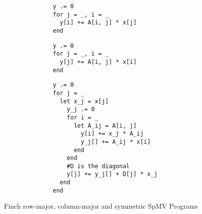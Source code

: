  \begin{wrapfigure}{r}{0.41\linewidth}
      \begin{minipage}[t]{0.18\textwidth}
          \vspace{0pt} %
          \begin{verbatim}
              y .= 0
              for j = _, i = _
                y[i] += A[i, j] * x[j]
              end
          \end{verbatim}
          \vspace{24pt} %
          \begin{verbatim}
              y .= 0
              for j = _, i = _
                y[j] += A[i, j] * x[i]
              end
          \end{verbatim}
      \end{minipage}\hfill%
      \begin{minipage}[t]{0.22\textwidth}
          \vspace{0pt} %
          \begin{verbatim}
              y .= 0
              for j = _
                let x_j = x[j]
                  y_j .= 0
                  for i = _
                    let A_ij = A[i, j]
                      y[i] += x_j * A_ij
                      y_j[] += A_ij * x[i]
                    end
                  end
                  #D is the diagonal
                  y[j] += y_j[] + D[j] * x_j
                end
              end
          \end{verbatim}
      \end{minipage}
      \vspace{-8pt}
      \caption{Finch row-major, column-major and symmetric SpMV Programs}
      \label{spmv_programs}
      \vspace{-12pt}
  \end{wrapfigure}
  
